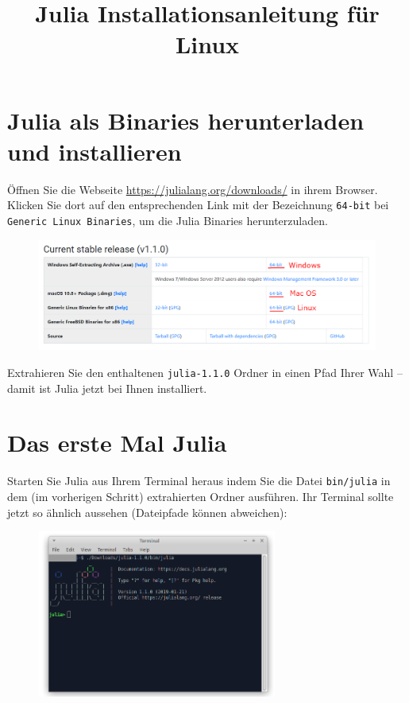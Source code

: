 \documentclass[11pt, a4paper]{scrartcl}
\title{Julia Installationsanleitung für Linux}
\author{}
\date{}
\begin{document}
	\maketitle
	
	
	
	
	
	
	\section{Julia als Binaries herunterladen und installieren}
	Öffnen Sie die Webseite \url{https://julialang.org/downloads/} in ihrem Browser. Klicken Sie dort auf den entsprechenden Link mit der Bezeichnung \texttt{64-bit} bei \texttt{Generic Linux Binaries}, um die Julia Binaries herunterzuladen.
	
	\begin{figure}[h!]
		\centering
		\includegraphics[width=\textwidth]{imgs/download.png}
	\end{figure}

	Extrahieren Sie den enthaltenen \texttt{julia-1.1.0} Ordner in einen Pfad Ihrer Wahl -- damit ist Julia jetzt bei Ihnen installiert.
	
	
	
	
	
	
	
	
	
	
	
	
	
	
	\newpage
	\section{Das erste Mal Julia}
	Starten Sie Julia aus Ihrem Terminal heraus indem Sie die Datei \texttt{bin/julia} in dem (im vorherigen Schritt) extrahierten Ordner ausführen. Ihr Terminal sollte jetzt so ähnlich aussehen (Dateipfade können abweichen):
	
	\begin{figure}[h!]
	\centering
	\includegraphics[width=0.7\textwidth]{imgs/julia_REPL.png}
	\end{figure}
\end{document}
